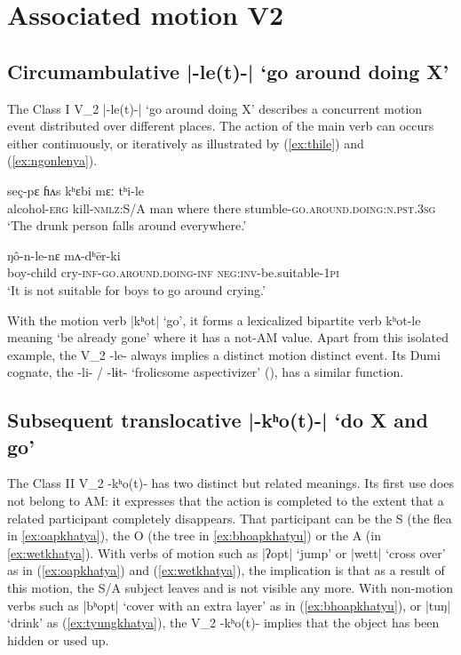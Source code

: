 \documentclass[oneside,a4paper,11pt]{article}
\newcommand{\ipa}[1]{{\phon#1}}
\newcommand{\dhatu}[2]{|\ipa{#1}| `#2'}
\begin{document}
\section{Associated motion V2}

\subsection{Circumambulative \dhatu{-le(t)-}{go around doing X}} \label{sec:v2.le}
The Class I V_2 \dhatu{-le(t)-}{go around doing X} describes a concurrent motion event distributed over different places. The action of the main verb can occurs either continuously, or iteratively as illustrated by (\ref{ex:thile}) and (\ref{ex:ngonlenya}). 

\begin{exe}
\ex \label{ex:thile}
 \gll  \ipa{tsi-ʔɛ} \ipa{seç-pɛ} \ipa{ɦʌs} \ipa{kʰɛbi} \ipa{mɛː} \ipa{tʰi-le} \\
 alcohol-\textsc{erg} kill-\textsc{nmlz}:S/A man where there stumble-\textsc{go.around.doing}:\textsc{n.pst.3sg} \\
 \glt `The drunk person falls around everywhere.' 
\end{exe}

\begin{exe}
\ex \label{ex:ngonlenya}
 \gll \ipa{lɛsbɛ-ʦɵ} \ipa{ŋô-n-le-nɛ} \ipa{mʌ-dʰēr-ki} \\
 boy-child cry-\textsc{inf}-\textsc{go.around.doing}-\textsc{inf} \textsc{neg}:\textsc{inv}-be.suitable-\textsc{1pi} \\
\glt `It is not suitable for boys to go around crying.' 
\end{exe}

With the motion verb \dhatu{kʰot}{go}, it forms a lexicalized bipartite verb \ipa{kʰot-le} meaning `be already gone' where it has a not-AM value. Apart from this isolated example, the V_2 \ipa{-le-} always implies a distinct motion distinct event. Its Dumi cognate, the \ipa{-li- / -lɨt-} `frolicsome aspectivizer' (\citealt[209-210]{driem93dumi}), has a similar function.

\subsection{Subsequent translocative \dhatu{-kʰo(t)-}{do X and go}} \label{sec:v2.khot}
The Class II V_2 \ipa{-kʰo(t)-} has two distinct but related meanings. Its first use does not belong to AM: it expresses that the action is completed to the extent that a related participant completely disappears. That participant can be the S (the flea in \ref{ex:oapkhatya}), the O (the tree in \ref{ex:bhoapkhatyu}) or the A (in \ref{ex:wetkhatya}). With verbs of motion such as \dhatu{ʔopt}{jump} or \dhatu{wett}{cross over} as in (\ref{ex:oapkhatya}) and (\ref{ex:wetkhatya}), the implication is that as a result of this motion, the S/A subject leaves and is not visible any more. With non-motion verbs such as \dhatu{bʰopt}{cover with an extra layer}  as in (\ref{ex:bhoapkhatyu}), or \dhatu{tuŋ}{drink} as (\ref{ex:tyungkhatya}), the V_2  \ipa{-kʰo(t)-} implies that the object has been hidden or used up. 
\end{document}
